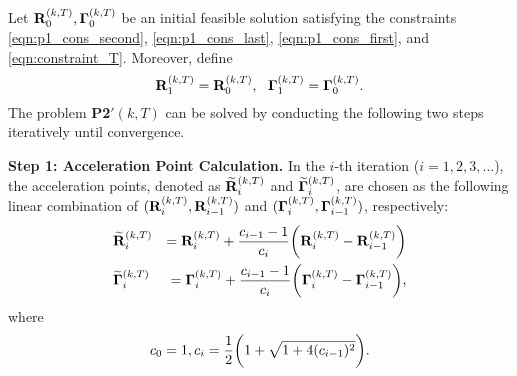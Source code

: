 Let $\mathbf{R}^{(k,T)}_{0}, \mathbf{\Gamma}^{(k,T)}_{0}$ be an initial feasible solution satisfying the constraints \eqref{eqn:p1_cons_second}, \eqref{eqn:p1_cons_last}, \eqref{eqn:p1_cons_first}, and \eqref{eqn:constraint_T}.
Moreover, define
$$\mathbf{R}^{(k,T)}_{1}=\mathbf{R}^{(k,T)}_{0}, ~~\mathbf{\Gamma}^{(k,T)}_{1}=\mathbf{\Gamma}^{(k,T)}_{0}.$$
The problem \textbf{P2$'(k,T)$} can be solved by conducting the following two steps iteratively until convergence. 

\textbf{Step 1: Acceleration Point Calculation.}
In the $i$-th iteration ($i=1,2,3,\dots$), the acceleration points, denoted as $\widetilde{\mathbf{R}}^{(k,T)}_{i}$ and $\widetilde{\mathbf{\Gamma}}^{(k,T)}_{i}$, are chosen as the following linear combination of $(\mathbf{R}^{(k,T)}_{i}, \mathbf{R}^{(k,T)}_{i-1})$ and $(\mathbf{\Gamma}^{(k,T)}_{i}, \mathbf{\Gamma}^{(k,T)}_{i-1})$, respectively:
\begin{eqnarray*}
    &\widetilde{\mathbf{R}}^{(k,T)}_{i} &= \mathbf{R}^{(k,T)}_{i} + \frac{c_{i-1}-1}{c_{i}} \bigg(
        \mathbf{R}^{(k,T)}_{i} - \mathbf{R}^{(k,T)}_{i-1}
    \bigg)\nonumber
    \\
    &\widetilde{\mathbf{\Gamma}}^{(k,T)}_{i} &= \mathbf{\Gamma}^{(k,T)}_{i} + \frac{c_{i-1}-1}{c_{i}}  \bigg(
        \mathbf{\Gamma}^{(k,T)}_{i} - \mathbf{\Gamma}^{(k,T)}_{i-1} 
    \bigg),\nonumber
\end{eqnarray*}
where
\begin{align*}
    c_{0} = 1, c_{i} = \frac{1}{2} \bigg( 1+\sqrt{ 1+4(c_{i-1})^2 } \bigg).
\end{align*}

